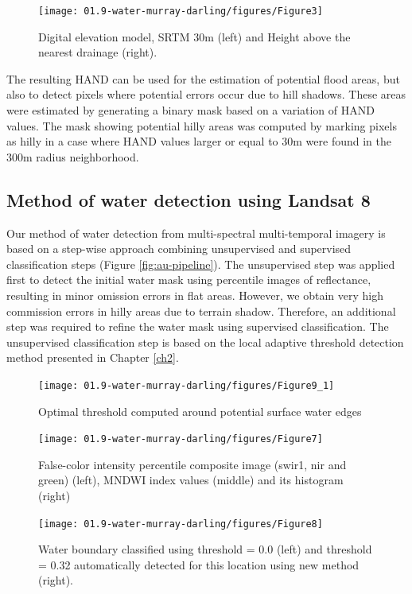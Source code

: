 \begin{figure}
	\centering
	\texttt{[image: 01.9-water-murray-darling/figures/Figure3]}
	\caption{Digital elevation model, SRTM 30m (left) and Height above the nearest drainage (right).}
	\label{fig:au-dem-hand}
\end{figure}

The resulting HAND can be used for the estimation of potential flood areas, but also to detect pixels where potential errors occur due to hill shadows. These areas were estimated by generating a binary mask based on a variation of HAND values. The mask showing potential hilly areas was computed by marking pixels as hilly in a case where HAND values larger or equal to 30m were found in the 300m radius neighborhood.

\subsection{Method of water detection using Landsat 8}

Our method of water detection from multi-spectral multi-temporal imagery is based on a step-wise approach combining unsupervised and supervised classification steps (Figure \ref{fig:au-pipeline}). The unsupervised step was applied first to detect the initial water mask using percentile images of reflectance, resulting in minor omission errors in flat areas. However, we obtain very high commission errors in hilly areas due to terrain shadow. Therefore, an additional step was required to refine the water mask using supervised classification. The unsupervised classification step is based on the local adaptive threshold detection method presented in Chapter \ref{ch2}. 

\begin{figure}[H]
	\centering
	\texttt{[image: 01.9-water-murray-darling/figures/Figure9\_1]}
	\caption{Optimal threshold computed around potential surface water edges}
\end{figure}

\begin{figure}[H]
	\centering
	\texttt{[image: 01.9-water-murray-darling/figures/Figure7]}
	\caption{False-color intensity percentile composite image (swir1, nir and green) (left), MNDWI index values (middle) and its histogram (right)}
\end{figure}

\begin{figure}[H]
	\centering
	\texttt{[image: 01.9-water-murray-darling/figures/Figure8]}
	\caption{Water boundary classified using threshold = 0.0 (left) and threshold = 0.32 automatically detected for this location using new method (right).}
	\label{fig:au_river_water_hist}
\end{figure}

